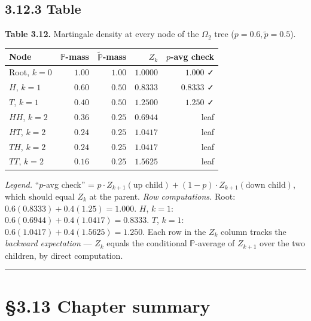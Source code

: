 \documentclass[
  10pt,
  twoside]{book}
\newcounter{none} %
\begin{document}
\subsection{3.12.3 Table}\label{table-15}

\textbf{Table 3.12.} Martingale density at every node of the
\(\Omega_2\) tree (\(p=0.6, \tilde p=0.5\)).

{\def\LTcaptype{none} %
\begin{table}[H]
\centering
\begin{tabular}{|l|r|r|r|r|}
\toprule
Node & \(\mathbb P\)-mass & \(\tilde{\mathbb P}\)-mass & \(Z_k\) & \(p\)-avg check \\
\midrule



Root, \(k=0\) & \(1.00\) & \(1.00\) & \(1.0000\) & \(1.000\) ✓ \\
\(H\), \(k=1\) & \(0.60\) & \(0.50\) & \(0.8333\) & \(0.8333\) ✓ \\
\(T\), \(k=1\) & \(0.40\) & \(0.50\) & \(1.2500\) & \(1.250\) ✓ \\
\(HH\), \(k=2\) & \(0.36\) & \(0.25\) & \(0.6944\) & leaf \\
\(HT\), \(k=2\) & \(0.24\) & \(0.25\) & \(1.0417\) & leaf \\
\(TH\), \(k=2\) & \(0.24\) & \(0.25\) & \(1.0417\) & leaf \\
\(TT\), \(k=2\) & \(0.16\) & \(0.25\) & \(1.5625\) & leaf \\
\bottomrule
\end{tabular}
\end{table}
}

\emph{Legend.} ``\(p\)-avg check'' =
\(p \cdot Z_{k+1}(\text{up child}) + (1-p)\cdot Z_{k+1}(\text{down child})\),
which should equal \(Z_k\) at the parent. \emph{Row computations.} Root:
\(0.6(0.8333) + 0.4(1.25) = 1.000\). \(H\), \(k=1\):
\(0.6(0.6944) + 0.4(1.0417) = 0.8333\). \(T\), \(k=1\):
\(0.6(1.0417) + 0.4(1.5625) = 1.250\). Each row in the \(Z_k\) column
tracks the \emph{backward expectation} --- \(Z_k\) equals the
conditional \(\mathbb P\)-average of \(Z_{k+1}\) over the two children,
by direct computation.

\begin{center}\rule{0.5\linewidth}{0.5pt}\end{center}

\section{§3.13 Chapter summary}\label{chapter-summary}
\end{document}
